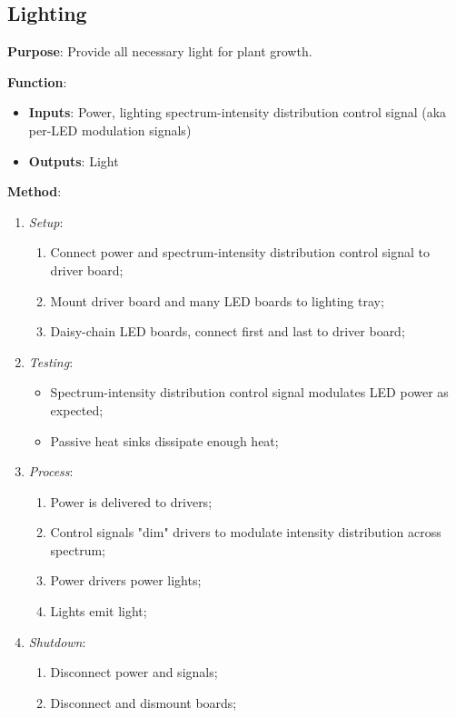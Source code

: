 \documentclass{report}
\begin{document}
\newpage

\subsection{Lighting}
\label{sec:lighting}

\textbf{Purpose}: Provide all necessary light for plant growth.

\textbf{Function}:
\begin{itemize}
    \item \textbf{Inputs}: Power, lighting spectrum-intensity distribution control signal (aka per-LED modulation signals)
    \item \textbf{Outputs}: Light
\end{itemize}

\textbf{Method}:
\begin{enumerate}
    \item \textit{Setup}:
    \begin{enumerate}
        \item Connect power and spectrum-intensity distribution control signal to driver board;
        \item Mount driver board and many LED boards to lighting tray;
        \item Daisy-chain LED boards, connect first and last to driver board;
    \end{enumerate}
    \item \textit{Testing}:
    \begin{itemize}
        \item Spectrum-intensity distribution control signal modulates LED power as expected;
        \item Passive heat sinks dissipate enough heat;
    \end{itemize}
    \item \textit{Process}:
    \begin{enumerate}
        \item Power is delivered to drivers;
        \item Control signals "dim" drivers to modulate intensity distribution across spectrum;
        \item Power drivers power lights;
        \item Lights emit light;
    \end{enumerate}
    \item \textit{Shutdown}:
    \begin{enumerate}
        \item Disconnect power and signals;
        \item Disconnect and dismount boards;
    \end{enumerate}
\end{enumerate}
\end{document}

